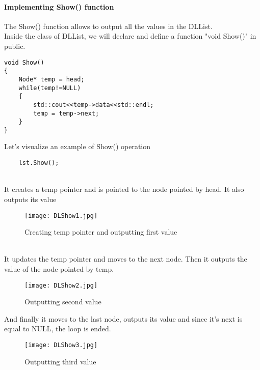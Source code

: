 \documentclass[11pt,fleqn]{book} %
\begin{document}
\paragraph{Implementing Show() function}
The Show()  function allows to output all the values in the DLList. \\
Inside the class of DLList, we will declare and define a function "void Show()" in public.
\begin{lstlisting}
void Show()
{
	Node* temp = head;
	while(temp!=NULL)
	{
		std::cout<<temp->data<<std::endl;
		temp = temp->next;
	}
}
\end{lstlisting}

\noindent Let's visualize an example of Show() operation
\begin{example}
	\begin{lstlisting}
	lst.Show();
	\end{lstlisting}~\\
	It creates a temp pointer and is pointed to the node pointed by head. It also outputs its value
	\begin{figure}[H]
		\centering
		\texttt{[image: DLShow1.jpg]}
		\caption{Creating temp pointer and outputting first value}
	\end{figure} ~\\
	It updates the temp pointer and moves to the next node. Then it outputs the value of the node pointed by temp.
	\begin{figure}[H]
		\centering
		\texttt{[image: DLShow2.jpg]}
		\caption{Outputting second value}
	\end{figure}
	
	And finally it moves to the last node, outputs its value and since it's next is equal to NULL, the loop is ended.
	\begin{figure}[H]
		\centering
		\texttt{[image: DLShow3.jpg]}
		\caption{Outputting third value}
	\end{figure} ~\\
\end{example}

\newpage
\end{document}
